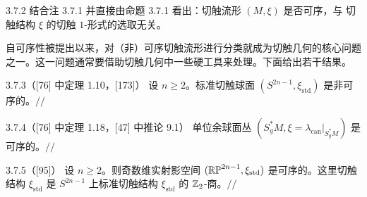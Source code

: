 \begin{wrem}{3.7.2}
结合注 3.7.1 并直接由命题 3.7.1 看出：切触流形 $(M,\xi)$ 是否可序，与
切触结构 $\xi$ 的切触 $1$-形式的选取无关。
\end{wrem}

自可序性被提出以来，对（非）可序切触流形进行分类就成为切触几何的核心问题
之一。这一问题通常要借助切触几何中一些硬工具来处理。下面给出若干结果。

\begin{wexam}{3.7.3}（[76] 中定理 1.10，[173]）
设 $n\ge2$。标准切触球面 $(S^{2n-1},\xi_{\mathrm{std}})$ 是非可序的。\hfill$//$
\end{wexam}

\begin{wexam}{3.7.4}（[76] 中定理 1.18，[47] 中推论 9.1）
单位余球面丛 $(S^*_gM,\xi=\lambda_{\mathrm{can}}|_{S^*_gM})$ 是可序的。\hfill$//$
\end{wexam}

\begin{wexam}{3.7.5}（[95]）
设 $n\ge2$。则奇数维实射影空间
$(\mathbb{RP}^{2n-1},\xi_{\mathrm{std}})$ 是可序的。这里切触结构
$\xi_{\mathrm{std}}$ 是 $S^{2n-1}$ 上标准切触结构
$\xi_{\mathrm{std}}$ 的 $\mathbb{Z}_2$-商。\hfill$//$
\end{wexam}
